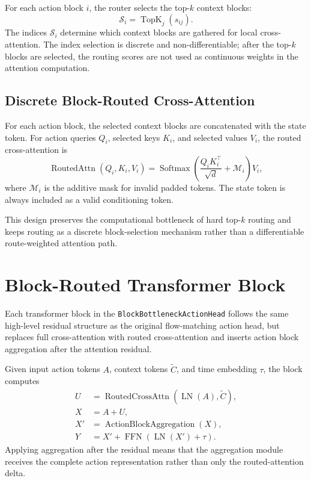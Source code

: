 \documentclass[11pt]{article}
\begin{document}
For each action block $i$, the router selects the top-$k$ context blocks:
\begin{equation}
    \mathcal{S}_i = \operatorname{TopK}_j(s_{ij}).
\end{equation}
The indices $\mathcal{S}_i$ determine which context blocks are gathered for local cross-attention. The index selection is discrete and non-differentiable; after the top-$k$ blocks are selected, the routing scores are not used as continuous weights in the attention computation.

\subsection{Discrete Block-Routed Cross-Attention}

For each action block, the selected context blocks are concatenated with the state token. For action queries $Q_i$, selected keys $K_i$, and selected values $V_i$, the routed cross-attention is
\begin{equation}
    \operatorname{RoutedAttn}(Q_i,K_i,V_i)
    =
    \operatorname{Softmax}
    \left(
    \frac{Q_i K_i^\top}{\sqrt{d}}
    +
    \mathcal{M}_i
    \right)V_i,
\end{equation}
where $\mathcal{M}_i$ is the additive mask for invalid padded tokens. The state token is always included as a valid conditioning token.

This design preserves the computational bottleneck of hard top-$k$ routing and keeps routing as a discrete block-selection mechanism rather than a differentiable route-weighted attention path.

\section{Block-Routed Transformer Block}

Each transformer block in the \texttt{BlockBottleneckActionHead} follows the same high-level residual structure as the original flow-matching action head, but replaces full cross-attention with routed cross-attention and inserts action block aggregation after the attention residual.

Given input action tokens $A$, context tokens $\tilde{C}$, and time embedding $\tau$, the block computes
\begin{align}
    U &= \operatorname{RoutedCrossAttn}(\operatorname{LN}(A), \tilde{C}), \\
    X &= A + U, \\
    X' &= \operatorname{ActionBlockAggregation}(X), \\
    Y &= X' + \operatorname{FFN}(\operatorname{LN}(X') + \tau).
\end{align}
Applying aggregation after the residual means that the aggregation module receives the complete action representation rather than only the routed-attention delta.
\end{document}
